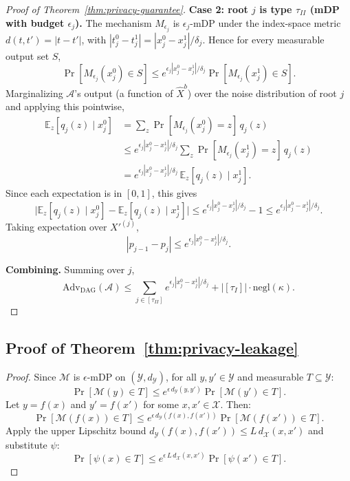 \begin{proof}[Proof of Theorem~\ref{thm:privacy-guarantee}]
\medskip
\noindent\textbf{Case 2: root $j$ is type $\tau_{II}$ (mDP with budget $\epsilon_j$).} The mechanism $M_{\epsilon_j}$ is $\epsilon_j$-mDP under the index-space metric $d(t, t') = |t - t'|$, with $|t_j^0 - t_j^1| = |x_j^0 - x_j^1| / \delta_j$. Hence for every measurable output set $S$,
\[
  \Pr[M_{\epsilon_j}(x_j^0) \in S] \leq e^{\epsilon_j |x_j^0 - x_j^1| / \delta_j} \Pr[M_{\epsilon_j}(x_j^1) \in S].
\]
Marginalizing $\mathcal{A}$'s output (a function of $\hat{X}^b$) over the noise distribution of root $j$ and applying this pointwise,
\begin{align*}
  \mathbb{E}_z[q_j(z) \mid x^0_j]
  &= \sum_z \Pr[M_{\epsilon_j}(x_j^0) = z]\, q_j(z) \\
  &\leq e^{\epsilon_j |x_j^0 - x_j^1| / \delta_j} \sum_z \Pr[M_{\epsilon_j}(x_j^1) = z]\, q_j(z) \\
  &= e^{\epsilon_j |x_j^0 - x_j^1| / \delta_j}\, \mathbb{E}_z[q_j(z) \mid x^1_j].
\end{align*}
Since each expectation is in $[0, 1]$, this gives
\[
  \big| \mathbb{E}_z[q_j(z) \mid x^0_j] - \mathbb{E}_z[q_j(z) \mid x^1_j] \big|
  \leq e^{\epsilon_j |x_j^0 - x_j^1| / \delta_j} - 1
  \leq e^{\epsilon_j |x_j^0 - x_j^1| / \delta_j}.
\]
Taking expectation over $X'^{(j)}$,
\[
  |p_{j-1} - p_j| \leq e^{\epsilon_j |x_j^0 - x_j^1| / \delta_j}.
\]

\medskip
\noindent\textbf{Combining.} Summing over $j$,
\[
  \mathrm{Adv}_{\mathrm{DAG}}(\mathcal{A})
  \leq \sum_{j \in [\tau_{II}]} e^{\epsilon_j |x_j^0 - x_j^1| / \delta_j} + |[\tau_I]| \cdot \mathrm{negl}(\kappa).
\]
\end{proof}

\subsection{Proof of Theorem~\ref{thm:privacy-leakage}}
\label{app:thm:privacy-leakage}
\begin{proof}
Since $\mathcal{M}$ is $\epsilon$-mDP on 
$(\mathcal{Y}, d_{\mathcal{Y}})$, for all 
$y, y' \in \mathcal{Y}$ and measurable 
$T \subseteq \mathcal{Y}$:
\[
    \Pr[\mathcal{M}(y) \in T] 
    \leq e^{\epsilon\, d_{\mathcal{Y}}(y, y')} 
    \Pr[\mathcal{M}(y') \in T].
\]
Let $y = f(x)$ and $y' = f(x')$ for some $x, x' \in \mathcal{X}$. Then:
\[
    \Pr[\mathcal{M}(f(x)) \in T] 
    \leq e^{\epsilon\, d_{\mathcal{Y}}(f(x), f(x'))} 
    \Pr[\mathcal{M}(f(x')) \in T].
\]
Apply the upper Lipschitz bound 
$d_{\mathcal{Y}}(f(x), f(x')) \leq L\, d_{\mathcal{X}}(x, x')$ and substitute $\psi$:
\[
    \Pr[\psi(x) \in T] 
    \leq e^{\epsilon\, L\, d_{\mathcal{X}}(x, x')} 
    \Pr[\psi(x') \in T].
\]
\end{proof}

